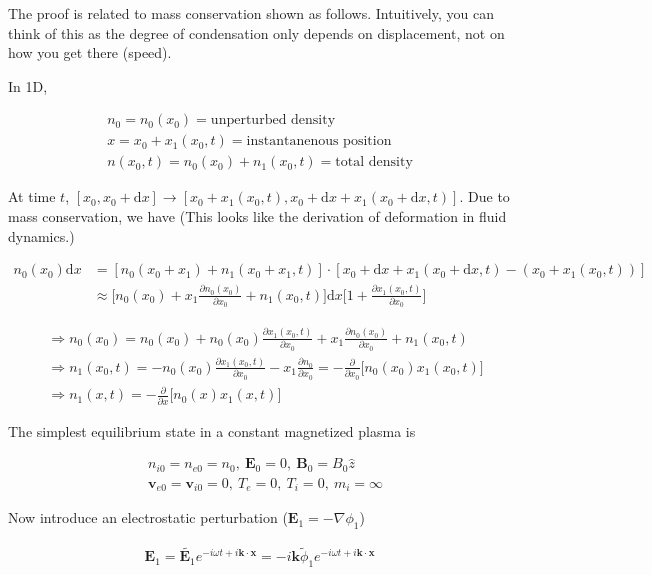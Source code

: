 \documentclass[
  notoc %
]{tufte-book}
\begin{document}
The proof is related to mass conservation shown as follows. Intuitively,
you can think of this as the degree of condensation only depends on
displacement, not on how you get there (speed).

In 1D,

\[
\begin{aligned}
n_0=n_0(x_0)=\text{unperturbed density} \\
x= x_0+x_1(x_0,t)=\text{instantanenous position} \\
n(x_0,t)=n_0(x_0)+n_1(x_0,t)=\text{total density}
\end{aligned}
\]

At time \(t\),
\([x_0,x_0+\mathrm{d}x]\rightarrow[x_0+x_1(x_0,t),x_0+\mathrm{d}x+x_1(x_0+\mathrm{d}x,t)]\).
Due to mass conservation, we have (This looks like the derivation of
deformation in fluid dynamics.)

\[
\begin{aligned}
n_0(x_0)\mathrm{d}x&=[n_0(x_0+x_1)+n_1(x_0+x_1,t)]\cdot[x_0+\mathrm{d}x+x_1(x_0+\mathrm{d}x,t)-(x_0+x_1(x_0,t))] \\
&\approx \Big[n_0(x_0)+x_1\frac{\partial n_0(x_0)}{\partial x_0}+n_1(x_0,t)\Big]\mathrm{d}x\Big[1+\frac{\partial x_1(x_0,t)}{\partial x_0}\Big]
\end{aligned}
\]

\[
\begin{aligned}
&\Rightarrow n_0(x_0)=n_0(x_0)+n_0(x_0)\frac{\partial x_1(x_0,t)}{\partial x_0}+x_1\frac{\partial n_0(x_0)}{\partial x_0}+n_1(x_0,t) \\
&\Rightarrow n_1(x_0,t)=-n_0(x_0)\frac{\partial x_1(x_0,t)}{\partial x_0}-x_1\frac{\partial n_0}{\partial x_0}=-\frac{\partial}{\partial x_0}\big[ n_0(x_0)x_1(x_0,t) \big] \\
&\Rightarrow n_1(x,t)=-\frac{\partial}{\partial x}\big[ n_0(x)x_1(x,t)\big]
\end{aligned}
\]

The simplest equilibrium state in a constant magnetized plasma is

\[
\begin{aligned}
&n_{i0}=n_{e0}=n_0,\ \mathbf{E}_0=0,\ \mathbf{B}_0=B_0\widehat{z} \\
&\mathbf{v}_{e0}=\mathbf{v}_{i0}=0,\ T_e=0,\ T_i=0,\ m_i=\infty
\end{aligned}
\]

Now introduce an electrostatic perturbation
(\(\mathbf{E}_1=-\nabla\phi_1\))

\[
\begin{aligned}
\mathbf{E}_1=\tilde{\mathbf{E}_1}e^{-i\omega t+i\mathbf{k}\cdot\mathbf{x}}=-i\mathbf{k}\tilde{\phi}_1 e^{-i\omega t+i\mathbf{k}\cdot\mathbf{x}}
\end{aligned}
\]
\end{document}
